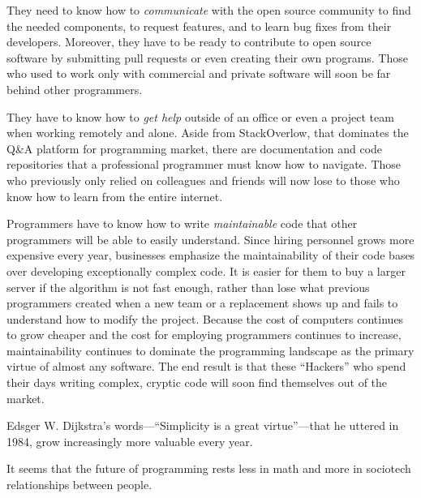 \documentclass{main}
\begin{document}
They need to know how to \emph{communicate} with the open source community
to find the needed components,
to request features, and to learn bug fixes from
their developers. Moreover, they have to be ready to contribute to open
source software by submitting pull requests or even creating their own
programs. Those who used to work only with commercial and private software
will soon be far behind other programmers.

They have to know how to \emph{get help} outside of an office or even
a project team when working remotely and alone. Aside from
StackOverlow, that dominates the
Q\&A platform for programming market, there are documentation and
code repositories that a professional programmer must know how to navigate.
Those who previously only relied on colleagues and friends will now lose to those
who know how to learn from the entire internet.

Programmers have to know how to write \emph{maintainable} code that
other programmers will be able to easily understand. Since hiring personnel
grows more expensive every year, businesses emphasize the maintainability
of their code bases over developing exceptionally complex code. It is easier for them to buy a larger server
if the algorithm is not fast enough, rather than lose what previous
programmers created when a new team or a replacement shows up and fails
to understand how to modify the project. Because the cost of computers
continues to grow cheaper and the cost for employing programmers
continues to increase, maintainability continues to dominate the programming
landscape as the primary virtue of almost any software.
The end result is that these ``Hackers'' who spend their days writing
complex, cryptic code will soon find themselves out of the market.

Edsger W. Dijkstra's words---``Simplicity is a great virtue''---that
he uttered in 1984,
grow increasingly more valuable every year.

It seems that the future of programming rests less in math and more in
sociotech relationships between people.
\end{document}
